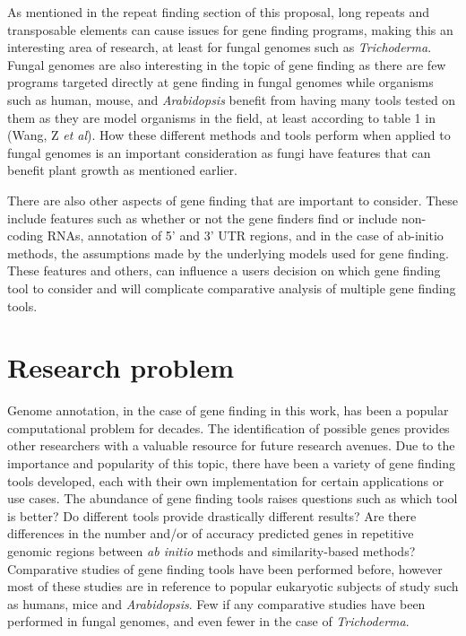 \documentclass[12pt]{article}
\begin{document}
As mentioned in the repeat finding section of this proposal, long
repeats and transposable elements can cause issues for gene finding
programs, making this an interesting area of research, at least for
fungal genomes such as \textit{Trichoderma}. Fungal genomes are also
interesting in the topic of gene finding as there are few programs
targeted directly at gene finding in fungal genomes while organisms
such as human, mouse, and \textit{Arabidopsis} benefit from having
many tools tested on them as they are model organisms in the field, at
least according to table 1 in (Wang, Z \textit{et
  al})\cite{GeneFinding}. How these different methods and tools
perform when applied to fungal genomes is an important consideration
as fungi have features that can benefit plant growth as mentioned
earlier.

There are also other aspects of gene finding that are important to
consider. These include features such as whether or not the gene
finders find or include non-coding RNAs, annotation of 5' and 3' UTR
regions, and in the case of ab-initio methods, the assumptions made by
the underlying models used for gene finding. These features and
others, can influence a users decision on which gene finding tool to
consider and will complicate comparative analysis of multiple gene
finding tools.


\section{Research problem}
Genome annotation, in the case of gene finding in this work, has been
a popular computational problem for decades. The identification of
possible genes provides other researchers with a valuable resource for
future research avenues. Due to the importance and popularity of this
topic, there have been a variety of gene finding tools developed, each
with their own implementation for certain applications or use
cases. The abundance of gene finding tools raises questions such as
which tool is better? Do different tools provide drastically different
results? Are there differences in the number and/or of accuracy
predicted genes in repetitive genomic regions between \textit{ab
  initio} methods and similarity-based methods?  Comparative studies
of gene finding tools have been performed before, however most of
these studies are in reference to popular eukaryotic subjects of study
such as humans, mice and \textit{Arabidopsis}. Few if any comparative
studies have been performed in fungal genomes, and even fewer in the
case of \textit{Trichoderma}.
\end{document}

